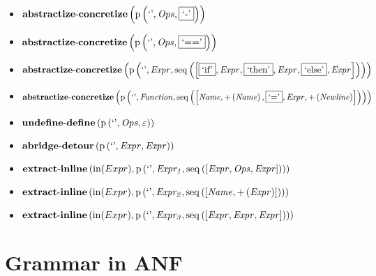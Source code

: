 {\begin{itemize}
\item $\mathbf{abstractize\text{-}concretize}\\\left(\mathrm{p}\left(\text{`'},\mathit{Ops},\fbox{$\text{`-'}$}\right)\right)$
\item $\mathbf{abstractize\text{-}concretize}\\\left(\mathrm{p}\left(\text{`'},\mathit{Ops},\fbox{$\text{`=='}$}\right)\right)$
\item $\mathbf{abstractize\text{-}concretize}\\\left(\mathrm{p}\left(\text{`'},\mathit{Expr},\mathrm{seq}\left(\left[\fbox{$\text{`if'}$}, \mathit{Expr}, \fbox{$\text{`then'}$}, \mathit{Expr}, \fbox{$\text{`else'}$}, \mathit{Expr}\right]\right)\right)\right)$
\item $\mathbf{abstractize\text{-}concretize}\\\left(\mathrm{p}\left(\text{`'},\mathit{Function},\mathrm{seq}\left(\left[\mathit{Name}, {+}\left(\mathit{Name}\right), \fbox{$\text{`='}$}, \mathit{Expr}, {+}\left(\mathit{Newline}\right)\right]\right)\right)\right)$
\item $\mathbf{undefine\text{-}define}\\\left(\mathrm{p}\left(\text{`'},\mathit{Ops},\varepsilon\right)\right)$
\item $\mathbf{abridge\text{-}detour}\\\left(\mathrm{p}\left(\text{`'},\mathit{Expr},\mathit{Expr}\right)\right)$
\item $\mathbf{extract\text{-}inline}\left(\mathrm{in}(Expr),\\\mathrm{p}\left(\text{`'},\mathit{Expr_1},\mathrm{seq}\left(\left[\mathit{Expr}, \mathit{Ops}, \mathit{Expr}\right]\right)\right)\right)$
\item $\mathbf{extract\text{-}inline}\left(\mathrm{in}(Expr),\\\mathrm{p}\left(\text{`'},\mathit{Expr_2},\mathrm{seq}\left(\left[\mathit{Name}, {+}\left(\mathit{Expr}\right)\right]\right)\right)\right)$
\item $\mathbf{extract\text{-}inline}\left(\mathrm{in}(Expr),\\\mathrm{p}\left(\text{`'},\mathit{Expr_3},\mathrm{seq}\left(\left[\mathit{Expr}, \mathit{Expr}, \mathit{Expr}\right]\right)\right)\right)$
\end{itemize}}

\section{Grammar in ANF}

